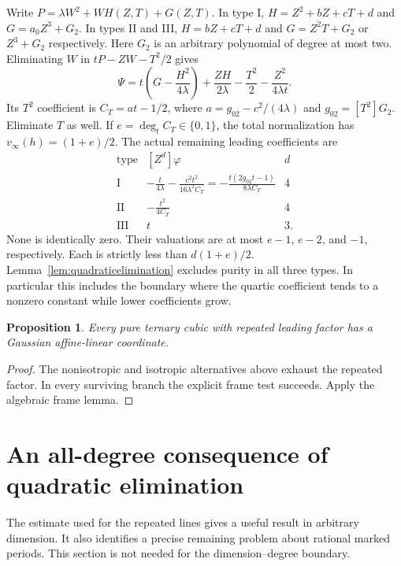 \documentclass[11pt]{article}
\newtheorem{proposition}[theorem]{Proposition}
\theoremstyle{definition}\newtheorem{definition}[theorem]{Definition}
\theoremstyle{remark}\newtheorem{remark}[theorem]{Remark}
\begin{document}
Write $P=\lambda W^2+W H(Z,T)+G(Z,T)$. In type I,
$H=Z^2+bZ+cT+d$ and $G=a_0Z^3+G_2$. In types II and III,
$H=bZ+cT+d$ and $G=Z^2T+G_2$ or $Z^3+G_2$ respectively.
Here $G_2$ is an arbitrary polynomial of degree at most two.
Eliminating $W$ in $tP-ZW-T^2/2$ gives
\[
 \Psi=t\left(G-\frac{H^2}{4\lambda}\right)
       +\frac{ZH}{2\lambda}-\frac{T^2}{2}
       -\frac{Z^2}{4\lambda t}.
\]
Its $T^2$ coefficient is $C_T=a t-1/2$, where
$a=g_{02}-c^2/(4\lambda)$ and $g_{02}=[T^2]G_2$.
Eliminate $T$ as well. If $e=\deg_t C_T\in\{0,1\}$, the total
normalization has $v_\infty(h)=(1+e)/2$. The actual remaining
leading coefficients are
\[
 \begin{array}{c|c|c}
 \text{type}&[Z^d]\varphi&d\\\hline
 \mathrm I&\displaystyle
  -\frac{t}{4\lambda}-\frac{c^2t^2}{16\lambda^2C_T}
   =-\frac{t(2g_{02}t-1)}{8\lambda C_T}&4\\[5pt]
 \mathrm {II}&\displaystyle-\frac{t^2}{4C_T}&4\\[4pt]
 \mathrm {III}&t&3.
 \end{array}
\]
None is identically zero. Their valuations are at most $e-1$,
$e-2$, and $-1$, respectively. Each is strictly less than
$d(1+e)/2$. Lemma~\ref{lem:quadraticelimination} excludes
purity in all three types. In particular this includes the
boundary where the quartic coefficient tends to a nonzero
constant while lower coefficients grow.

\begin{proposition}\label{prop:repeatedcomplete}
Every pure ternary cubic with repeated leading factor has a
Gaussian affine-linear coordinate.
\end{proposition}
\begin{proof}
The nonisotropic and isotropic alternatives above exhaust the
repeated factor. In every surviving branch the explicit frame
test succeeds. Apply the algebraic frame lemma.
\end{proof}

\section{An all-degree consequence of quadratic elimination}
\label{sec:constantfibres}

The estimate used for the repeated lines gives a useful result
in arbitrary dimension. It also identifies a precise remaining
problem about rational marked periods. This section is not
needed for the dimension--degree boundary.
\end{document}
